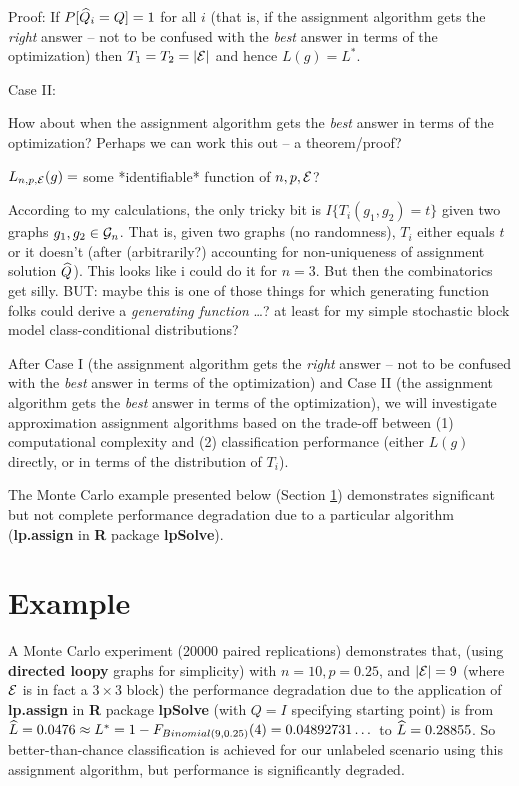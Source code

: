 Proof:
If $P[\widehat{Q}_i = Q]=1$ for all $i$
(that is, if the assignment algorithm gets the {\em right} answer --
not to be confused with the {\em best} answer
in terms of the optimization)
then $T_1=T_2=|\mathcal{E}|$ and hence $L(g)=L^*$.


Case II:

How about when the assignment algorithm gets the {\em best} answer
in terms of the optimization?
Perhaps we can work this out -- a theorem/proof?

\thma
$L_{n,p,\mathcal{E}}(g) =$ some *identifiable* function of $n,p,\mathcal{E}$?
\thmb

According to my calculations,
the only tricky bit is $I\{T_i(g_1,g_2) = t\}$
given two graphs $g_1,g_2 \in \mathcal{G}_n$.
That is, given two graphs (no randomness),
$T_i$ either equals $t$ or it doesn't
(after (arbitrarily?) accounting for non-uniqueness
of assignment solution $\widehat{Q}$).
This looks like i could do it for $n=3$.
But then the combinatorics get silly.
BUT: maybe this is one of those things for which
generating function folks
could derive a {\em generating function} \dots?
at least for my simple stochastic block model
class-conditional distributions?


After Case I
(the assignment algorithm gets the {\em right} answer --
not to be confused with the {\em best} answer in terms of the optimization)
and Case II
(the assignment algorithm gets the {\em best} answer in terms of the optimization),
we will investigate approximation assignment algorithms based on the trade-off between
(1) computational complexity and
(2) classification performance
(either $L(g)$ directly, or in terms of the distribution of $T_i$).


The Monte Carlo example presented below (Section \ref{Example})
demonstrates significant but not complete performance degradation
due to a particular algorithm
({\bf lp.assign} in {\bf R} package {\bf lpSolve}).




\section{Example}\label{Example}

A Monte Carlo experiment (20000 paired replications) demonstrates that,
(using {\bf directed loopy} graphs for simplicity)
with $n=10, p=0.25$, and $|\mathcal{E}|=9$
(where $\mathcal{E}$ is in fact a $3 \times 3$ block)
the performance degradation due to the application of
{\bf lp.assign} in {\bf R} package {\bf lpSolve}
(with $Q=I$ specifying starting point)
is from
$\widehat{L} = 0.0476 \approx L^* = 1-F_{Binomial(9,0.25)}(4) = 0.04892731\dots$
to
 $\widehat{L} = 0.28855$.
So better-than-chance classification is achieved for our unlabeled scenario
using this assignment algorithm,
but performance is significantly degraded.

